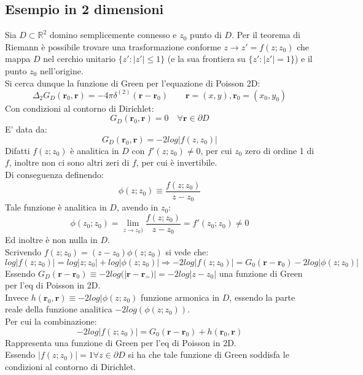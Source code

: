 \documentclass[twoside]{article}
\renewcommand{\vec}[1]{\textbf{#1}}
\begin{document}
\subsection{Esempio in 2 dimensioni}
Sia $D\subset\mathds{R}^2$ domino semplicemente connesso e $z_0$ punto di $D$. Per il teorema di Riemann è possibile trovare una trasformazione conforme $z\to z'=f(z;z_0)$ che mappa $D$ nel cerchio unitario $\{z':|z'|\le 1\}$ (e la sua frontiera su $\{z':|z'|= 1\}$) e il punto $z_0$ nell'origine.\\
Si cerca dunque la funzione di Green per l'equazione di Poisson 2D:
\begin{equation}
    \Delta_2G_D(\vec{r}_0,\vec{r})=-4\pi\delta^{(2)}(\vec{r}-\vec{r}_0)\qquad \vec{r}=(x,y), \vec{r}_0=(x_0,y_0)
\end{equation}
Con condizioni al contorno di Dirichlet:
\begin{equation}
    G_D(\vec{r}_0,\vec{r})=0 \quad\forall \vec{r}\in \partial D
\end{equation}
E' data da:
\begin{equation}
    G_D(\vec{r}_0,\vec{r})=-2log|f(z,z_0)|
\end{equation}
Difatti $f(z;z_0)$ è analitica in $D$ con $f'(z;z_0)\ne0$, per cui $z_0$ zero di ordine 1 di $f$, inoltre non ci sono altri zeri di $f$, per cui è invertibile.\\
Di conseguenza definendo:
\begin{equation}
    \phi(z;z_0)\equiv \frac{f(z;z_0)}{z-z_0}
\end{equation}
Tale funzione è analitica in $D$, avendo in $z_0$:
\begin{equation}
    \phi(z_0;z_0)=\lim_{z\to z_0)}\frac{f(z;z_0)}{z-z_0}=f'(z_0;z_0)\ne 0
\end{equation}
Ed inoltre è non nulla in $D$.\\
Scrivendo $f(z;z_0)=(z-z_0)\phi(z;z_0)$ si vede che:
\begin{equation}
    log|f(z;z_0)|=log|z;z_0|+log|\phi(z;z_0)| \Longrightarrow -2log|f(z;z_0)|=G_0(\vec{r}-\vec{r}_0)-2log|\phi(z;z_0)|
\end{equation}
Essendo $G_D(\vec{r}-\vec{r}_0)\equiv -2log(|\vec{r}-\vec{r}_=)|=-2log|z-z_0|$ una funzione di Green per l'eq di Poisson in 2D.\\
Invece $h(\vec{r}_0,\vec{r})\equiv-2log|\phi(z;z_0)$ funzione armonica in $D$, essendo la parte reale della funzione analitica $-2log(\phi(z;z_0))$.\\
Per cui la combinazione:
\begin{equation}
    -2log|f(z;z_0)|=G_0(\vec{r}-\vec{r}_0)+h(\vec{r}_0,\vec{r})
\end{equation}
Rappresenta una funzione di Green per l'eq di Poisson in 2D.\\
Essendo $|f(z;z_0)|=1 \forall z\in\partial D$ si ha che tale funzione di Green soddisfa le condizioni al contorno di Dirichlet.\\
\end{document}
